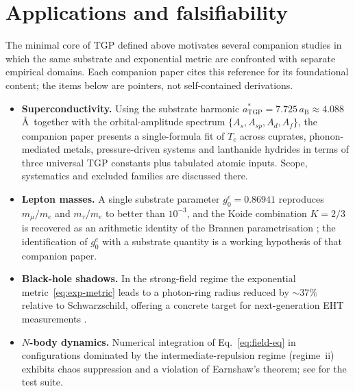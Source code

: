 \documentclass[11pt,a4paper]{article}
\begin{document}
\section{Applications and falsifiability}\label{sec:applications}

The minimal core of TGP defined above motivates several companion
studies in which the same substrate and exponential metric are
confronted with separate empirical domains. Each companion paper cites
this reference for its foundational content; the items below are
pointers, not self-contained derivations.

\begin{itemize}[nosep]
  \item \textbf{Superconductivity.} Using the substrate harmonic
    $a^{\ast}_{\mathrm{TGP}}=7.725\,a_{\mathrm{B}}\approx 4.088$\,\AA\
    together with the orbital-amplitude spectrum
    $\{A_{s},A_{sp},A_{d},A_{f}\}$, the companion paper \cite{TGP-SC}
    presents a single-formula fit of $T_{c}$ across cuprates,
    phonon-mediated metals, pressure-driven systems and lanthanide
    hydrides in terms of three universal TGP constants plus tabulated
    atomic inputs. Scope, systematics and excluded families are
    discussed there.
  \item \textbf{Lepton masses.} A single substrate parameter
    $g_{0}^{e}=0.86941$ reproduces $m_{\mu}/m_{e}$ and $m_{\tau}/m_{e}$
    to better than $10^{-3}$, and the Koide combination $K=2/3$ is
    recovered as an arithmetic identity of the Brannen parametrisation
    \cite{TGP-leptons}; the identification of $g_{0}^{e}$ with a
    substrate quantity is a working hypothesis of that companion paper.
  \item \textbf{Black-hole shadows.} In the strong-field regime the
    exponential metric~\eqref{eq:exp-metric} leads to a photon-ring
    radius reduced by $\sim 37\%$ relative to Schwarzschild, offering a
    concrete target for next-generation EHT measurements
    \cite{TGP-BH}.
  \item \textbf{$N$-body dynamics.} Numerical integration of
    Eq.~\eqref{eq:field-eq} in configurations dominated by the
    intermediate-repulsion regime (regime~ii) exhibits chaos suppression
    and a violation of Earnshaw's theorem; see \cite{TGP-nbody} for the
    test suite.
\end{itemize}
\end{document}
